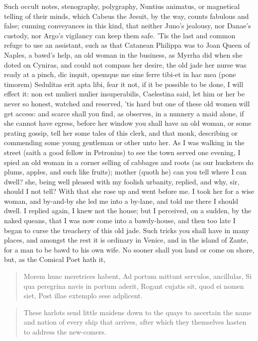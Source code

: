 Such occult notes, stenography, polygraphy, Nuntius animatus, or
magnetical telling of their minds, which Cabeus the Jesuit, by
the way, counts fabulous and false; cunning conveyances in this kind,
that neither Juno's jealousy, nor Danae's custody, nor Argo's vigilancy
can keep them safe. 'Tis the last and common refuge to use an
assistant, such as that Catanean Philippa was to Joan Queen of Naples,
a bawd's help, an old woman in the business, as Myrrha did
when she doted on Cyniras, and could not compass her desire, the old
jade her nurse was ready at a pinch, dic inquit, opemque me sine ferre
tibi-et in hac mea (pone timorem) Sedulitas erit apta libi, fear it
not, if it be possible to be done, I will effect it: non est mulieri
mulier insuperabilis, Caelestina said, let him or her be never so
honest, watched and reserved, 'tis hard but one of these old women will
get access: and scarce shall you find, as \Austin{} observes, in a
nunnery a maid alone, if she cannot have egress, before her window you
shall have an old woman, or some prating gossip, tell her some tales of
this clerk, and that monk, describing or commending some young
gentleman or other unto her. As I was walking in the street (saith a
good fellow in Petronius) to see the town served one evening, I
spied an old woman in a corner selling of cabbages and roots (as our
hucksters do plums, apples, and such like fruits); mother (quoth he)
can you tell where I can dwell? she, being well pleased with my foolish
urbanity, replied, and why, sir, should I not tell? With that she rose
up and went before me. I took her for a wise woman, and by-and-by she
led me into a by-lane, and told me there I should dwell. I replied
again, I knew not the house; but I perceived, on a sudden, by the naked
queans, that I was now come into a bawdy-house, and then too late I
began to curse the treachery of this old jade. Such tricks you shall
have in many places, and amongst the rest it is ordinary in Venice, and
in the island of Zante, for a man to be bawd to his own wife. No sooner
shall you land or come on shore, but, as the Comical Poet hath it,

\begin{latin}
\begin{verse}
Morem hunc meretrices habent,
Ad portum mittunt servulos, ancillulas,
Si qua peregrina navis in portum aderit,
Rogant cujatis sit, quod ei nomen siet,
Post illae extemplo sese adplicent.
\end{verse}
\end{latin}
\translationrule%
\begin{verse}%
These harlots send little maidens down to the quays to ascertain the name and nation of every ship that arrives, after which they themselves hasten to address the new-comers.
\end{verse}%

